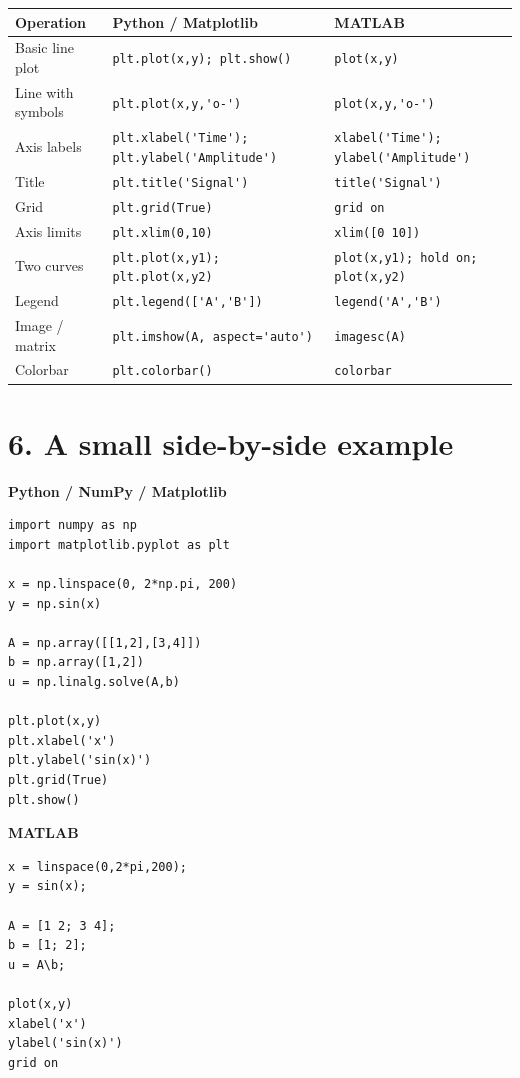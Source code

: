 \documentclass[9pt]{extarticle}
\newcommand{\py}[1]{\lstinline[style=code]!#1!}
\newcommand{\matlab}[1]{\lstinline[style=code]!#1!}
\begin{document}
\begin{tabularx}{\textwidth}{>{\raggedright\arraybackslash}p{} X X}
\toprule
\textbf{Operation} & \textbf{Python / Matplotlib} & \textbf{MATLAB} \\
\midrule
Basic line plot & \py{plt.plot(x,y); plt.show()} & \matlab{plot(x,y)} \\
Line with symbols & \py{plt.plot(x,y,'o-')} & \matlab{plot(x,y,'o-')} \\
Axis labels & \py{plt.xlabel('Time'); plt.ylabel('Amplitude')} & \matlab{xlabel('Time'); ylabel('Amplitude')} \\
Title & \py{plt.title('Signal')} & \matlab{title('Signal')} \\
Grid & \py{plt.grid(True)} & \matlab{grid on} \\
Axis limits & \py{plt.xlim(0,10)} & \matlab{xlim([0 10])} \\
Two curves & \py{plt.plot(x,y1); plt.plot(x,y2)} & \matlab{plot(x,y1); hold on; plot(x,y2)} \\
Legend & \py{plt.legend(['A','B'])} & \matlab{legend('A','B')} \\
Image / matrix & \py{plt.imshow(A, aspect='auto')} & \matlab{imagesc(A)} \\
Colorbar & \py{plt.colorbar()} & \matlab{colorbar} \\
\bottomrule
\end{tabularx}

\section*{6. A small side-by-side example}

\begin{minipage}[t]{0.48\textwidth}
\textbf{Python / NumPy / Matplotlib}
\begin{lstlisting}[style=code]
import numpy as np
import matplotlib.pyplot as plt

x = np.linspace(0, 2*np.pi, 200)
y = np.sin(x)

A = np.array([[1,2],[3,4]])
b = np.array([1,2])
u = np.linalg.solve(A,b)

plt.plot(x,y)
plt.xlabel('x')
plt.ylabel('sin(x)')
plt.grid(True)
plt.show()
\end{lstlisting}
\end{minipage}
\hfill
\begin{minipage}[t]{0.48\textwidth}
\textbf{MATLAB}
\begin{lstlisting}[style=code]
x = linspace(0,2*pi,200);
y = sin(x);

A = [1 2; 3 4];
b = [1; 2];
u = A\b;

plot(x,y)
xlabel('x')
ylabel('sin(x)')
grid on
\end{lstlisting}
\end{minipage}
\end{document}
